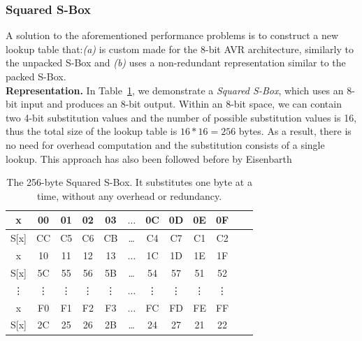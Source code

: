 \documentclass[11pt]{article}
\begin{document}
\subsubsection{Squared S-Box}\label{ssbox}
A solution to the aforementioned performance problems is to construct a new lookup table that:\emph{(a)} is custom made for the 8-bit AVR architecture, similarly to the unpacked S-Box and \emph{(b)} uses a non-redundant representation similar to the packed S-Box.\\
\textbf{Representation.} In Table~\ref{squared_sbox}, we demonstrate a \emph{Squared S-Box}, which uses an 8-bit input and produces an 8-bit output. Within an 8-bit space, we can contain two 4-bit substitution values and the number of possible substitution values is 16, thus the total size of the lookup table is $16*16=256$ bytes. As a result, there is no need for overhead computation and the substitution consists of a single lookup. This approach has also been followed before by Eisenbarth~\cite{eisenbarth2012compact}\\
\begin{table}[h]
\footnotesize
\centering
\begin{tabular}{| c | c  | c | c | c  | c  | c | c | c  | c | c | c |}
\hline
  x & 00 & 01 & 02 & 03  &  $\dots$  & 0C & 0D & 0E & 0F   \\
\hline
 S[x] & CC & C5 & C6 & CB & \dots & C4 & C7 & C1 & C2   \\
\hline
  x & 10 & 11 & 12 & 13  &  $\dots$  & 1C & 1D & 1E & 1F   \\
\hline
 S[x] & 5C & 55 & 56 & 5B & \dots & 54 & 57 & 51 & 52   \\
\hline
  \vdots & \vdots & \vdots & \vdots & \vdots  &  $\dots$  & \vdots &\vdots & \vdots & \vdots   \\
\hline
  x & F0 & F1 & F2 & F3  &  $\dots$  & FC & FD & FE & FF   \\
\hline
 S[x] & 2C & 25 & 26 & 2B & \dots & 24 & 27 & 21 & 22   \\


\hline
\end{tabular}
 \caption{\footnotesize The 256-byte Squared S-Box. It substitutes one byte at a time, without any overhead or redundancy.}
 \label{squared_sbox}
\end{table}
\end{document}

